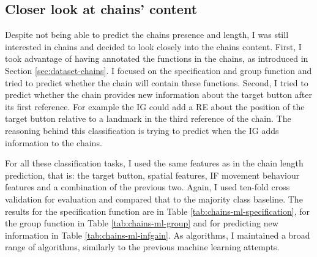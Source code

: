 \subsection{Closer look at chains' content}
Despite not being able to predict the chains presence and length, I was still interested in chains and decided to look closely into the chains content. First, I took advantage of having annotated the functions in the chains, as introduced in Section \ref{sec:dataset-chains}. I focused on the specification and group function and tried to predict whether the chain will contain these functions. Second, I tried to predict whether the chain provides new information about the target button after its first reference. For example the IG could add a RE about the position of the target button relative to a landmark in the third reference of the chain. The reasoning behind this classification is trying to predict when the IG adds information to the chains.

For all these classification tasks, I used the same features as in the chain length prediction, that is: the target button, spatial features, IF movement behaviour features and a combination of the previous two. Again, I used ten-fold cross validation for evaluation and compared that to the majority class baseline. The results for the specification function are in Table \ref{tab:chains-ml-specification}, for the group function in Table \ref{tab:chains-ml-group} and for predicting new information in Table \ref{tab:chains-ml-infgain}. As algorithms, I maintained a broad range of algorithms, similarly to the previous machine learning attempts.

